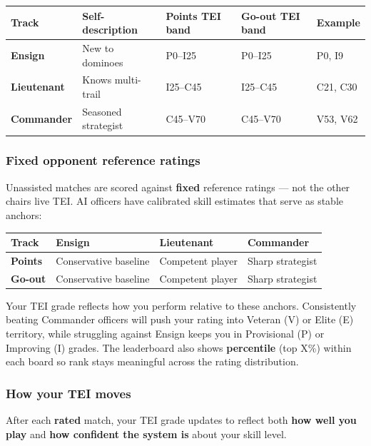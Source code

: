 \documentclass[11pt]{article}
\begin{document}
\begin{longtable}[]{@{}lllll@{}}
\toprule\noalign{}
Track & Self-description & Points TEI band & Go-out TEI band & Example \\
\midrule\noalign{}
\endhead
\bottomrule\noalign{}
\endlastfoot
\textbf{Ensign} & New to dominoes & P0--I25 & P0--I25 & P0, I9 \\
\textbf{Lieutenant} & Knows multi-trail & I25--C45 & I25--C45 & C21, C30 \\
\textbf{Commander} & Seasoned strategist & C45--V70 & C45--V70 & V53, V62 \\
\end{longtable}

\subsubsection{Fixed opponent reference
ratings}\label{fixed-opponent-reference-ratings}

Unassisted matches are scored against \textbf{fixed} reference ratings
--- not the other chairs\textquotesingle{} live TEI. AI officers have calibrated skill estimates that serve as stable anchors:

\begin{longtable}[]{@{}llll@{}}
\toprule\noalign{}
Track & Ensign & Lieutenant & Commander \\
\midrule\noalign{}
\endhead
\bottomrule\noalign{}
\endlastfoot
\textbf{Points} & Conservative baseline & Competent player & Sharp strategist \\
\textbf{Go-out} & Conservative baseline & Competent player & Sharp strategist \\
\end{longtable}

Your TEI grade reflects how you perform relative to these anchors. Consistently beating Commander officers will push your rating into Veteran (V) or Elite (E) territory, while struggling against Ensign keeps you in Provisional (P) or Improving (I) grades. The leaderboard also shows \textbf{percentile} (top X\%)
within each board so rank stays meaningful across the rating distribution.

\subsubsection{How your TEI moves}\label{how-your-tei-moves}

After each \textbf{rated} match, your TEI grade updates to reflect both
\textbf{how well you play} and \textbf{how confident the system is} about
your skill level.
\end{document}
